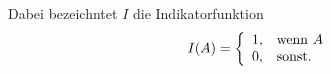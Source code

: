 Dabei bezeichntet $I$ die Indikatorfunktion
$$
    I(A)=\left\{\begin{array}{l l}
        1, & \text{wenn } A \\
        0, & \text{sonst.}
    \end{array}\right.
$$